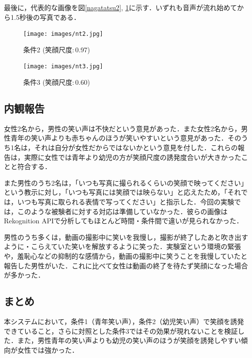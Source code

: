 \documentclass[report,10pt,uplatex,titlepage]{jsarticle}
\begin{document}
最後に，代表的な画像を図\ref{nagatatsu2}, \ref{nagatatsu3}に示す．いずれも音声が流れ始めてから1.5秒後の写真である．

\begin{figure}[h!]
\begin{minipage}{0.49\columnwidth}
\begin{center}
\texttt{[image: images/nt2.jpg]}
\end{center}
\caption{条件2 (笑顔尺度$:$0.97)}
\label{nagatatsu2}
\end{minipage}
\begin{minipage}{0.49\columnwidth}
\begin{center}
\texttt{[image: images/nt3.jpg]}
\end{center}
\caption{条件3 (笑顔尺度$:$0.60)}
\label{nagatatsu3}
\end{minipage}
\end{figure}


\subsection{内観報告}

女性2名から，男性の笑い声は不快だという意見があった．また女性2名から，男性青年の笑い声よりも赤ちゃんのほうが笑いやすいという意見があった．そのうち1名は，それは自分が女性だからではないかという意見を付した．これらの報告は，実際に女性では青年より幼児の方が笑顔尺度の誘発度合いが大きかったことと符合する．

また男性のうち2名は，「いつも写真に撮られるくらいの笑顔で映ってください」という教示に対し，「いつも写真には笑顔では映らない」と応えたため，「それでは，いつも写真に取られる表情で写ってください」と指示した．今回の実験では，このような被験者に対する対応は準備していなかった．彼らの画像はRekognition APIで分析してもほとんど時間・条件間で違いが見られなかった．

男性のうち多くは，動画の撮影中に笑いを我慢し，撮影が終了したあと吹き出すように・こらえていた笑いを解放するように笑った．実験室という環境の緊張や，羞恥心などの抑制的な感情から，動画の撮影中に笑うことを我慢していたと報告した男性がいた．これに比べて女性は動画の終了を待たず笑顔になった場合が多かった．

\subsection{まとめ}

本システムにおいて，条件1（青年笑い声），条件2（幼児笑い声）で笑顔を誘発できていること，さらに対照とした条件3ではその効果が現れないことを検証した．また，男性青年の笑い声よりも幼児の笑い声のほうが笑顔を誘発しやすい傾向が女性では強かった．
\end{document}

